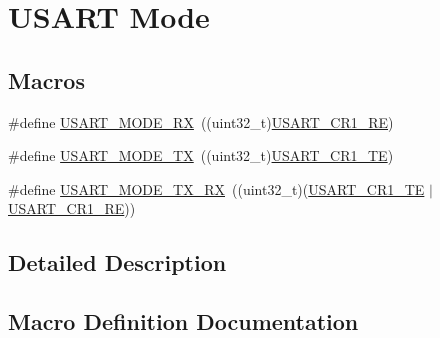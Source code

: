 \hypertarget{group___u_s_a_r_t___mode}{}\section{U\+S\+A\+RT Mode}
\label{group___u_s_a_r_t___mode}
\subsection*{Macros}
\begin{DoxyCompactItemize}
\item 
\#define \hyperlink{group___u_s_a_r_t___mode_ga3efdc5989048ad122a5c9c1e325bb89c}{U\+S\+A\+R\+T\+\_\+\+M\+O\+D\+E\+\_\+\+RX}~((uint32\+\_\+t)\hyperlink{group___peripheral___registers___bits___definition_gada0d5d407a22264de847bc1b40a17aeb}{U\+S\+A\+R\+T\+\_\+\+C\+R1\+\_\+\+RE})
\item 
\#define \hyperlink{group___u_s_a_r_t___mode_ga7a2fcdc3486d2675cc147811b996eb16}{U\+S\+A\+R\+T\+\_\+\+M\+O\+D\+E\+\_\+\+TX}~((uint32\+\_\+t)\hyperlink{group___peripheral___registers___bits___definition_gade7f090b04fd78b755b43357ecaa9622}{U\+S\+A\+R\+T\+\_\+\+C\+R1\+\_\+\+TE})
\item 
\#define \hyperlink{group___u_s_a_r_t___mode_ga82418ff60ab8dac647eb7a6ba6db1284}{U\+S\+A\+R\+T\+\_\+\+M\+O\+D\+E\+\_\+\+T\+X\+\_\+\+RX}~((uint32\+\_\+t)(\hyperlink{group___peripheral___registers___bits___definition_gade7f090b04fd78b755b43357ecaa9622}{U\+S\+A\+R\+T\+\_\+\+C\+R1\+\_\+\+TE} $\vert$\hyperlink{group___peripheral___registers___bits___definition_gada0d5d407a22264de847bc1b40a17aeb}{U\+S\+A\+R\+T\+\_\+\+C\+R1\+\_\+\+RE}))
\end{DoxyCompactItemize}


\subsection{Detailed Description}


\subsection{Macro Definition Documentation}
\mbox{\label{group___u_s_a_r_t___mode_ga3efdc5989048ad122a5c9c1e325bb89c}} 
